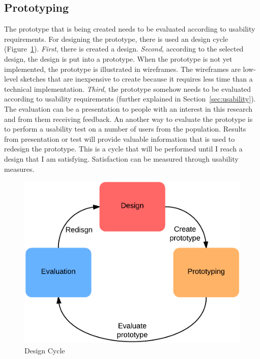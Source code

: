     \subsection{Prototyping} \label{sec:methodusabilitytesting}
    The prototype that is being created needs to be evaluated according to usability requirements. For designing the prototype, there is used an design cycle (Figure~\ref{fig:cycle}). {\it First}, there is created a design. {\it Second}, according to the selected design, the design is put into a prototype. When the prototype is not yet implemented, the prototype is illustrated in wireframes. The wireframes are low-level sketches that are inexpensive to create because it requires less time than a technical implementation. {\it Third}, the prototype somehow needs to be evaluated according to usability requirements (further explained in Section~\ref{sec:usability}). The evaluation can be a presentation to people with an interest in this research and from them receiving feedback. An another way to evaluate the prototype is to perform a usability test on a number of users from the population. Results from presentation or test will provide valuable information that is used to redesign the prototype. This is a cycle that will be performed until I reach a design that I am satisfying. Satisfaction can be measured through usability measures. 

    \begin{figure}[H]
      \centering
      \includegraphics[scale=0.3]{pics/DesignCycle.png}
      \caption[Design Cycle \cite{Norman}]{Design Cycle}
      \label{fig:cycle}
    \end{figure}

